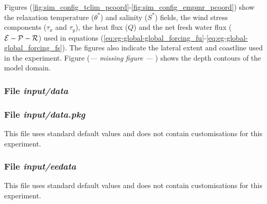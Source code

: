 



Figures (\ref{fig:sim_config_tclim_pcoord}-\ref{fig:sim_config_empmr_pcoord})
show the relaxation temperature ($\theta^{\ast}$) and salinity ($S^{\ast}$)
fields, the wind stress components ($\tau_x$ and $\tau_y$), the heat flux ($Q$)
and the net fresh water flux (${\cal E} - {\cal P} - {\cal R}$) used
in equations
(\ref{eq:eg-global-global_forcing_fu}-\ref{eq:eg-global-global_forcing_fs}).
The figures also indicate the lateral extent and coastline used in the
experiment. Figure ({\it --- missing figure --- }) %
shows the depth contours of the model domain.

\subsubsection{File {\it input/data}}



\subsubsection{File {\it input/data.pkg}}

This file uses standard default values and does not contain
customisations for this experiment.

\subsubsection{File {\it input/eedata}}

This file uses standard default values and does not contain
customisations for this experiment.

